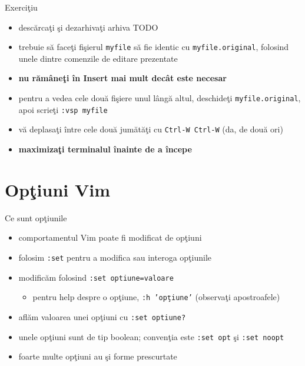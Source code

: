 \documentclass{beamer}
\begin{document}
\begin{frame}{Exerciţiu}
\begin{itemize} %
  \item descărcaţi şi dezarhivaţi arhiva TODO
  \item trebuie să faceţi fişierul \texttt{myfile} să fie identic cu
  \texttt{myfile.original}, folosind unele dintre comenzile de editare
  prezentate
  \item \textbf{nu rămâneţi în Insert mai mult decât este necesar}
  \item pentru a vedea cele două fişiere unul lângă altul, deschideţi
  \texttt{myfile.original}, apoi scrieţi \texttt{:vsp myfile}
  \item vă deplasaţi între cele două jumătăţi cu \texttt{Ctrl-W Ctrl-W} (da,
  de două ori)
  \item \textbf{maximizaţi terminalul înainte de a începe}
\end{itemize}
\end{frame}

\section{Opţiuni Vim}
\frame{\tableofcontents[currentsection]}

\begin{frame}{Ce sunt opţiunile}
\begin{itemize}
  \item<1-> comportamentul Vim poate fi modificat de opţiuni
  \item<2-> folosim \texttt{:set} pentru a modifica sau interoga opţiunile
  \item<3-> modificăm folosind \texttt{:set optiune=valoare}
    \begin{itemize}
    \item<4-> pentru help despre o opţiune, \texttt{:h 'opţiune'} (observaţi
    apostroafele)
    \end{itemize}
  \item<5-> aflăm valoarea unei opţiuni cu \texttt{:set optiune?}
  \item<6-> unele opţiuni sunt de tip boolean; convenţia este \texttt{:set opt}
  şi \texttt{:set noopt}
  \item<7-> foarte multe opţiuni au şi forme prescurtate
\end{itemize}
\end{frame}
\end{document}
